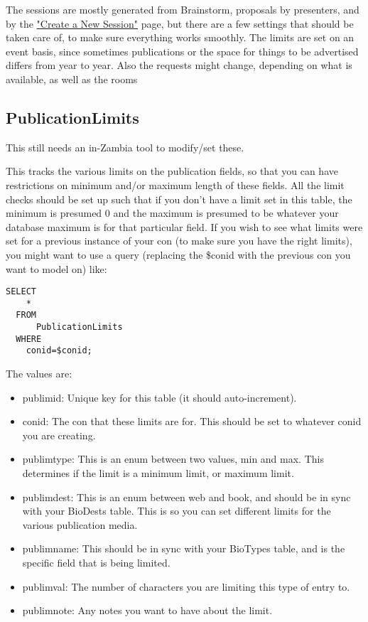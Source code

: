 \documentclass[captions=tablesignature]{scrartcl}
\begin{document}
The sessions are mostly generated from Brainstorm, proposals by
presenters, and by the \href{../webpages/CreateSession.php}{"Create a New Session"} page, but there are a
few settings that should be taken care of, to make sure everything
works smoothly.  The limits are set on an event basis, since
sometimes publications or the space for things to be advertised
differs from year to year.  Also the requests might change,
depending on what is available, as well as the rooms
\subsection{PublicationLimits}
\label{sec-13-1}

This still needs an in-Zambia tool to modify/set these.

This tracks the various limits on the publication fields, so that
you can have restrictions on minimum and/or maximum length of these
fields.  All the limit checks should be set up such that if you
don't have a limit set in this table, the minimum is presumed 0 and
the maximum is presumed to be whatever your database maximum is for
that particular field.  If you wish to see what limits were set for
a previous instance of your con (to make sure you have the right
limits), you might want to use a query (replacing the \$conid with
the previous con you want to model on) like:
\begin{verbatim}
SELECT
    *
  FROM
      PublicationLimits
  WHERE
    conid=$conid;
\end{verbatim}
The values are:
\begin{itemize}
\item publimid: Unique key for this table (it should auto-increment).
\item conid: The con that these limits are for.  This should be set to
whatever conid you are creating.
\item publimtype: This is an enum between two values, min and max.
This determines if the limit is a minimum limit, or maximum
limit.
\item publimdest: This is an enum between web and book, and should be
in sync with your BioDests table.  This is so you can set
different limits for the various publication media.
\item publimname: This should be in sync with your BioTypes table, and
is the specific field that is being limited.
\item publimval: The number of characters you are limiting this type of
entry to.
\item publimnote: Any notes you want to have about the limit.
\end{itemize}
\end{document}

